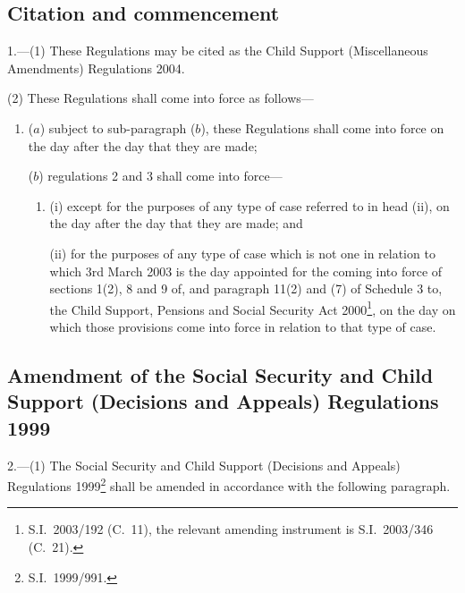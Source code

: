 \documentclass[12pt,a4paper]{article}
\begin{document}
{\sloppy

\tableofcontents

}

\bigskip

\setcounter{secnumdepth}{-2}

\subsection[1. Citation and commencement]{Citation and commencement}

1.---(1)  These Regulations may be cited as the Child Support (Miscellaneous Amendments) Regulations 2004.

(2) These Regulations shall come into force as follows—
\begin{enumerate}\item[]
($a$) subject to sub-paragraph ($b$), these Regulations shall come into force on the day after the day that they are made;

($b$) regulations 2 and 3 shall come into force—
\begin{enumerate}\item[]
(i) except for the purposes of any type of case referred to in head (ii), on the day after the day that they are made; and

(ii) for the purposes of any type of case which is not one in relation to which 3rd March 2003 is the day appointed for the coming into force of sections 1(2), 8 and 9 of, and paragraph 11(2) and (7) of Schedule 3 to, the Child Support, Pensions and Social Security Act 2000\footnote{S.I.\ 2003/192 (C.\ 11), the relevant amending instrument is S.I.\ 2003/346 (C.\ 21).}, on the day on which those provisions come into force in relation to that type of case.
\end{enumerate}
\end{enumerate}

\subsection[2. Amendment of the Social Security and Child Support (Decisions and Appeals) Regulations 1999]{Amendment of the Social Security and Child Support (Decisions and Appeals) Regulations 1999}

2.---(1)  The Social Security and Child Support (Decisions and Appeals) Regulations 1999\footnote{S.I.\ 1999/991.} shall be amended in accordance with the following paragraph.
\end{document}
